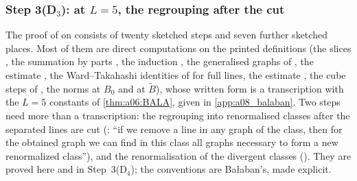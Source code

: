 
\subsubsection*{Step 3(D$_3$): \cite[Prop.~1]{Ba3} at $L=5$, the regrouping after the cut}

The proof of \cite[Prop.~1, (1.33)]{Ba3} on \cite[pp.~420--445]{Ba3} consists of twenty sketched steps and seven further sketched places. Most of them are direct computations on the printed definitions (the slices \cite[(2.6), (2.10)--(2.12)]{Ba3}, the summation by parts \cite[(2.8)]{Ba3}, the induction \cite[(2.16)]{Ba3}, the generalised graphs of \cite[Prop.~2.2]{Ba3}, the estimate \cite[(2.17)]{Ba3}, the Ward--Takahashi identities of \cite[pp.~430--431]{Ba3} for full lines, the estimate \cite[(3.1)]{Ba3}, the cube steps of \cite[p.~433]{Ba3}, the norms \cite[(1.32)]{Ba3} at $B_0$ and at $\tilde B$), whose written form is a transcription with the $L=5$ constants of \cref{thm:a06:BALA}, given in \cref{app:a08_balaban}. Two steps need more than a transcription: the regrouping into renormalised classes after the separated lines are cut (\cite[p.~432]{Ba3}: ``if we remove a line in any graph of the class, then for the obtained graph we can find in this class all graphs necessary to form a new renormalized class''), and the renormalisation of the divergent classes (\cite[pp.~434--445]{Ba3}). They are proved here and in Step~3(D$_4$); the conventions are Ba{\l}aban's, made explicit.

